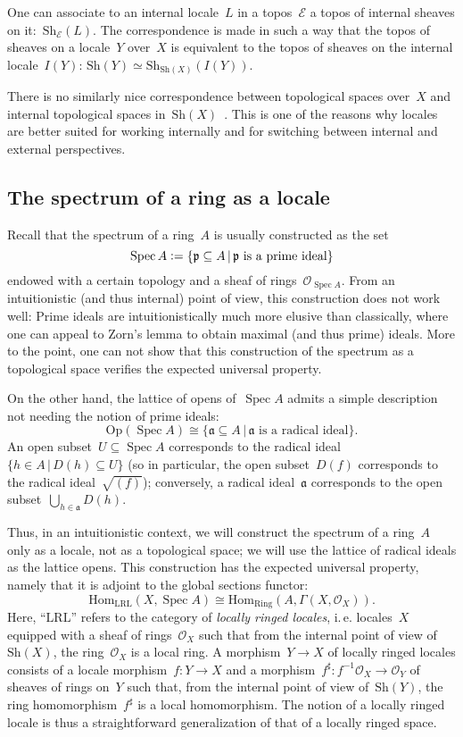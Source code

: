 \documentclass[10pt]{amsart}
\makeatletter
\theoremstyle{definition}
\theoremstyle{plain}
\theoremstyle{remark}
\newcommand{\E}{\mathcal{E}}
\renewcommand{\O}{\mathcal{O}}
\newcommand{\aaa}{\mathfrak{a}}
\newcommand{\ppp}{\mathfrak{p}}
\newcommand{\Hom}{\mathrm{Hom}}
\newcommand{\Sh}{\mathrm{Sh}}
\newcommand{\Ring}{\mathrm{Ring}}
\newcommand{\LRL}{\mathrm{LRL}}
\DeclareMathOperator{\Spec}{Spec}
\newcommand{\Open}{\mathrm{Op}}
\newcommand{\?}{\,{:}\,}
\renewcommand{\_}{\mathpunct{.}\,}
\newcommand{\ie}{i.\,e.\@\xspace}
\newcommand{\defeq}{\vcentcolon=}
\makeatother
\begin{document}
One can associate to an internal locale~$L$ in a topos~$\E$ a topos of internal
sheaves on it:~$\Sh_\E(L)$. The correspondence is made in such a way that the topos of
sheaves on a locale~$Y$ over~$X$ is equivalent to the topos of sheaves on the
internal locale~$I(Y)$: $\Sh(Y) \simeq \Sh_{\Sh(X)}(I(Y))$.

There is no similarly nice correspondence between topological spaces
over~$X$ and internal topological spaces
in~$\Sh(X)$~\cite[corollary~C1.6.7]{johnstone:elephant}. This is one of the
reasons why locales are better suited for working internally and for switching
between internal and external perspectives.


\subsection{The spectrum of a ring as a locale} Recall that the spectrum
of a ring~$A$ is usually constructed as the set
\[ \Spec A \defeq \{ \ppp \subseteq A \,|\,
  \text{$\ppp$ is a prime ideal} \} \]
endowed with a certain topology and a sheaf of rings~$\O_{\Spec A}$. From an
intuitionistic (and thus internal) point of view, this construction does not
work well: Prime ideals are intuitionistically much more elusive than
classically, where one can appeal to Zorn's lemma to obtain maximal (and thus
prime) ideals. More to the point, one can not show that this construction of
the spectrum as a topological space verifies the expected universal property.

On the other hand, the lattice of opens of~$\Spec A$ admits a simple
description not needing the notion of prime ideals:
\[ \Open(\Spec A) \cong \{ \aaa \subseteq A \,|\,
  \text{$\aaa$ is a radical ideal} \}. \]
An open subset~$U \subseteq \Spec A$ corresponds to the radical ideal~$\{ h \in
A \,|\, D(h) \subseteq U \}$ (so in particular, the open subset~$D(f)$
corresponds to the radical ideal~$\sqrt{(f)}$); conversely, a radical ideal~$\aaa$
corresponds to the open subset~$\bigcup_{h \in \aaa} D(h)$.

Thus, in an intuitionistic context, we will construct the spectrum of a ring~$A$
only as a locale, not as a topological space; we will use the lattice of
radical ideals as the lattice opens. This construction has the expected
universal property, namely that it is adjoint to the global sections functor:
\[ \Hom_{\LRL}(X, \Spec A) \cong \Hom_{\Ring}(A, \Gamma(X,\O_X)). \]
Here, ``$\LRL$'' refers to the category of \emph{locally ringed locales}, \ie
locales~$X$ equipped with a sheaf of rings~$\O_X$ such that from the internal point of
view of~$\Sh(X)$, the ring~$\O_X$ is a local ring. A morphism~$Y \to X$ of
locally ringed locales consists of a locale morphism~$f : Y \to X$ and a
morphism~$f^\sharp : f^{-1} \O_X \to \O_Y$ of sheaves of rings on~$Y$ such that, from the
internal point of view of~$\Sh(Y)$, the ring homomorphism~$f^\sharp$ is a local
homomorphism. The notion of a locally ringed locale is thus a straightforward
generalization of that of a locally ringed space.
\end{document}
